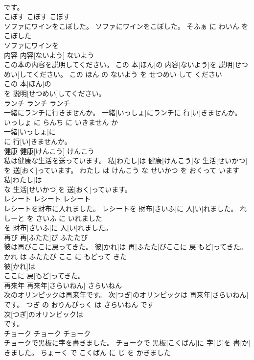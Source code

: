 \documentclass[8pt]{extreport}
\begin{document}
\begin{CJK}{UTF8}{min}
\\	です。			
\\	こぼす	こぼす	こぼす	
\\	ソファにワインをこぼした。	ソファにワインをこぼした。	そふぁ に わいん を こぼした	
\\	ソファにワインを
\\	内容	内容[ないよう]	ないよう	
\\	この本の内容を説明してください。	この 本[ほん]の 内容[ないよう]を 説明[せつめい]してください。	この ほん の ないよう を せつめい して ください	
\\	この 本[ほん]の
\\	を 説明[せつめい]してください。			
\\	ランチ	ランチ	ランチ	
\\	一緒にランチに行きませんか。	一緒[いっしょ]にランチに 行[い]きませんか。	いっしょ に らんち に いきません か	
\\	一緒[いっしょ]に
\\	に 行[い]きませんか。			
\\	健康	健康[けんこう]	けんこう	
\\	私は健康な生活を送っています。	私[わたし]は 健康[けんこう]な 生活[せいかつ]を 送[おく]っています。	わたし は けんこう な せいかつ を おくって います	
\\	私[わたし]は
\\	な 生活[せいかつ]を 送[おく]っています。			
\\	レシート	レシート	レシート	
\\	レシートを財布に入れました。	レシートを 財布[さいふ]に 入[い]れました。	れしーと を さいふ に いれました	
\\	を 財布[さいふ]に 入[い]れました。			
\\	再び	再[ふたた]び	ふたたび	
\\	彼は再びここに戻ってきた。	彼[かれ]は 再[ふたた]びここに 戻[もど]ってきた。	かれ は ふたたび ここ に もどって きた	
\\	彼[かれ]は
\\	ここに 戻[もど]ってきた。			
\\	再来年	再来年[さらいねん]	さらいねん	
\\	次のオリンピックは再来年です。	次[つぎ]のオリンピックは 再来年[さらいねん]です。	つぎ の おりんぴっく は さらいねん です	
\\	次[つぎ]のオリンピックは
\\	です。			
\\	チョーク	チョーク	チョーク	
\\	チョークで黒板に字を書きました。	チョークで 黒板[こくばん]に 字[じ]を 書[か]きました。	ちょーく で こくばん に じ を かきました	

\end{CJK}
\end{document}
